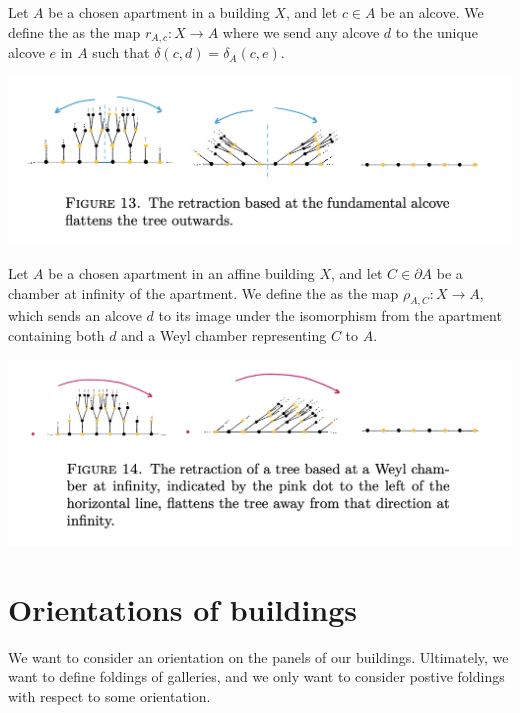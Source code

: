 \documentclass[11pt]{article}
\begin{document}
\begin{definition}
    Let $A$ be a chosen apartment in a building $X$, and let $c\in A$ be an alcove. We define the  as the map $r_{A,c}:X\longrightarrow A$ where we send any alcove $d$ to the unique alcove $e$ in $A$ such that $\delta(c,d)=\delta_A(c,e)$. 
\end{definition}

\includegraphics[scale=0.7]{Screenshot 2023-02-15 at 13.32.45.png}\\

\begin{definition}
    Let $A$ be a chosen apartment in an affine building $X$, and let $C\in \partial A$ be a chamber at infinity of the apartment. We define the  as the map $\rho_{A,C}:X\longrightarrow A$, which sends an alcove $d$ to its image under the isomorphism from the apartment containing both $d$ and a Weyl chamber representing $C$ to $A$. 
\end{definition}


\includegraphics[scale=0.7]{Screenshot 2023-02-15 at 13.31.58.png}


\section{Orientations of buildings}

We want to consider an orientation on the panels of our buildings. Ultimately, we want to define foldings of galleries, and we only want to consider postive foldings with respect to some orientation.
\end{document}
